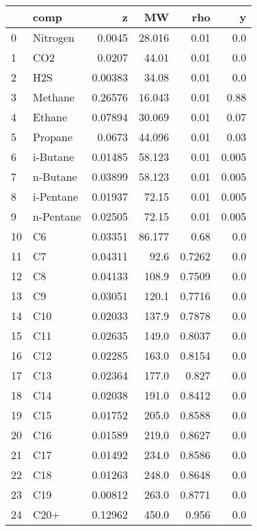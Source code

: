 \begin{tabular}{llrrrr}
\toprule
{} &       comp &       z &     MW &    rho &     y \\
\midrule
0  &   Nitrogen &  0.0045 & 28.016 &   0.01 &   0.0 \\
1  &        CO2 &  0.0207 &  44.01 &   0.01 &   0.0 \\
2  &        H2S & 0.00383 &  34.08 &   0.01 &   0.0 \\
3  &    Methane & 0.26576 & 16.043 &   0.01 &  0.88 \\
4  &     Ethane & 0.07894 & 30.069 &   0.01 &  0.07 \\
5  &    Propane &  0.0673 & 44.096 &   0.01 &  0.03 \\
6  &   i-Butane & 0.01485 & 58.123 &   0.01 & 0.005 \\
7  &   n-Butane & 0.03899 & 58.123 &   0.01 & 0.005 \\
8  &  i-Pentane & 0.01937 &  72.15 &   0.01 & 0.005 \\
9  &  n-Pentane & 0.02505 &  72.15 &   0.01 & 0.005 \\
10 &         C6 & 0.03351 & 86.177 &   0.68 &   0.0 \\
11 &         C7 & 0.04311 &   92.6 & 0.7262 &   0.0 \\
12 &         C8 & 0.04133 &  108.9 & 0.7509 &   0.0 \\
13 &         C9 & 0.03051 &  120.1 & 0.7716 &   0.0 \\
14 &        C10 & 0.02033 &  137.9 & 0.7878 &   0.0 \\
15 &        C11 & 0.02635 &  149.0 & 0.8037 &   0.0 \\
16 &        C12 & 0.02285 &  163.0 & 0.8154 &   0.0 \\
17 &        C13 & 0.02364 &  177.0 &  0.827 &   0.0 \\
18 &        C14 & 0.02038 &  191.0 & 0.8412 &   0.0 \\
19 &        C15 & 0.01752 &  205.0 & 0.8588 &   0.0 \\
20 &        C16 & 0.01589 &  219.0 & 0.8627 &   0.0 \\
21 &        C17 & 0.01492 &  234.0 & 0.8586 &   0.0 \\
22 &        C18 & 0.01263 &  248.0 & 0.8648 &   0.0 \\
23 &        C19 & 0.00812 &  263.0 & 0.8771 &   0.0 \\
24 &       C20+ & 0.12962 &  450.0 &  0.956 &   0.0 \\
\bottomrule
\end{tabular}
